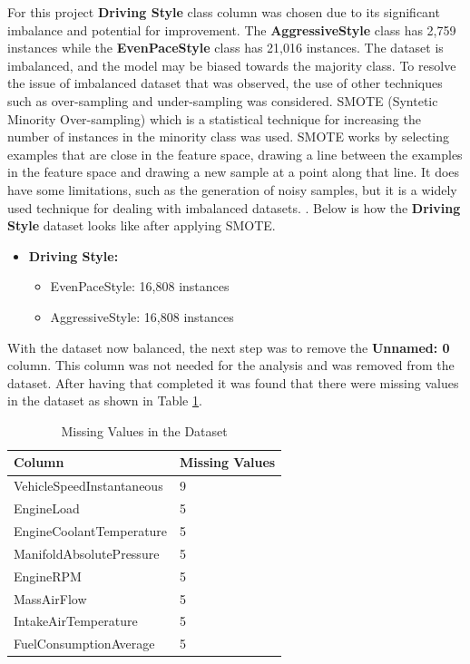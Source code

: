 For this project \textbf{Driving Style} class column was chosen due to its significant imbalance and potential for improvement. 
The \textbf{AggressiveStyle} class has 2,759 instances while the \textbf{EvenPaceStyle} class has 21,016 instances. The dataset is imbalanced, 
and the model may be biased towards the majority class. To resolve the issue of imbalanced dataset that was observed, the use of other techniques such as over-sampling and under-sampling was considered.
SMOTE (Syntetic Minority Over-sampling) which is a statistical technique for increasing the number of instances in the minority class was used. SMOTE works by selecting
examples that are close in the feature space, drawing a line between the examples in the feature space and drawing a new sample at a point along that line. 
It does have some limitations, such as the generation of noisy samples, but it is a widely used technique for dealing with imbalanced datasets. \cite{fernandez2018smote}. 
Below is how the \textbf{Driving Style} dataset looks like after applying SMOTE.

\begin{itemize}
    \item \textbf{Driving Style:}
    \begin{itemize}
        \item EvenPaceStyle: 16,808 instances
        \item AggressiveStyle: 16,808 instances
    \end{itemize}
\end{itemize}

With the dataset now balanced, the next step was to remove the \textbf{Unnamed: 0} column. This column was not needed for the analysis and was removed from the dataset.
After having that completed it was found that there were missing values in the dataset as shown in Table \ref{table:data_missing_values}.

\begin{table}[H]
    \centering    
    \begin{tabular}{|l|l|}
    \hline
    \textbf{Column}                   & \textbf{Missing Values} \\ \hline
    VehicleSpeedInstantaneous         & 9                       \\ \hline
    EngineLoad                        & 5                       \\ \hline
    EngineCoolantTemperature          & 5                       \\ \hline
    ManifoldAbsolutePressure          & 5                       \\ \hline
    EngineRPM                         & 5                       \\ \hline
    MassAirFlow                       & 5                       \\ \hline
    IntakeAirTemperature              & 5                       \\ \hline
    FuelConsumptionAverage            & 5                       \\ \hline
    \end{tabular}
    \caption{Missing Values in the Dataset}
    \label{table:data_missing_values}
\end{table}

